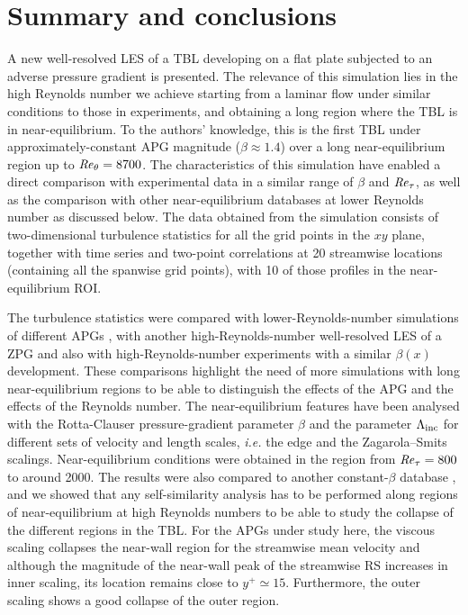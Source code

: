 \section{Summary and conclusions} \label{sec:Conclusions}

A new well-resolved LES of a TBL developing on a flat plate subjected to an adverse pressure gradient is presented. The relevance of this simulation lies in the high Reynolds number we achieve starting from a laminar flow under similar conditions to those in experiments, and obtaining a long region where the TBL is in near-equilibrium. 
To the authors’ knowledge, this is the first TBL under approximately-constant APG magnitude  ($\beta\approx 1.4$) over a long near-equilibrium region up to $\mbox{\textit{Re}}_{\theta}=8700$. The characteristics of this simulation have enabled a direct comparison with experimental data in a similar range of $\beta$ and $\mbox{\textit{Re}}_{\tau}$, as well as the comparison with other near-equilibrium databases at lower Reynolds number as discussed below. 
The data obtained from the simulation consists of two-dimensional turbulence statistics for all the grid points in the $xy$ plane, together with time series and two-point correlations at 20 streamwise locations (containing all the spanwise grid points), with 10 of those profiles in the near-equilibrium ROI.

The turbulence statistics were compared with lower-Reynolds-number simulations of different APGs \citep{bobke2017}, with another high-Reynolds-number well-resolved LES of a ZPG \citep{E-AmorZPG} and also with high-Reynolds-number experiments \citep{MTL_expSANMIGUEL} with a similar $\beta(x)$ development. 
These comparisons highlight the need of more simulations with long near-equilibrium regions to be able to distinguish the effects of the APG and the effects of the Reynolds number. The near-equilibrium features have been analysed with the Rotta-Clauser pressure-gradient parameter $\beta$ and the parameter $\Lambda_{\rm inc}$ for different sets of velocity and length scales, {\it i.e.} the edge and the Zagarola--Smits scalings. Near-equilibrium conditions were obtained in the region from $\mbox{\textit{Re}}_{\tau}=800$ to around 2000. 
The results were also compared to another constant-$\beta$ database \citep{Kitsios2016}, and we showed that any self-similarity analysis has to be performed along regions of near-equilibrium at high Reynolds numbers  to be able to study the collapse of the different regions in the TBL.
For the APGs under study here, the viscous scaling collapses the near-wall region for the streamwise mean velocity and although the magnitude of the near-wall peak of the streamwise RS increases in inner scaling, its location remains close to $y^+ \simeq 15$.
Furthermore, the outer scaling shows a good collapse of the outer region.

